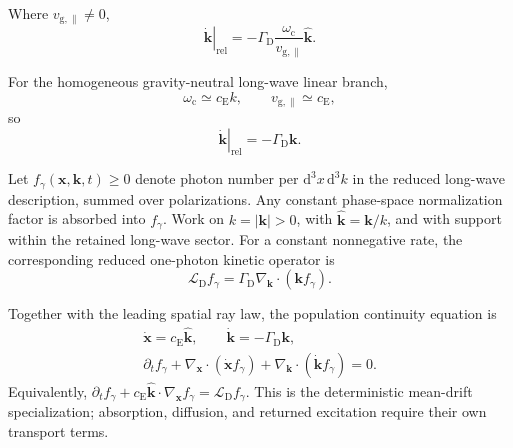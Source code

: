 Where $v_{\mathrm{g},\parallel}\neq0$,
\begin{equation}
    \boxed{
    \left.\dot{\mathbf{k}}\right|_{\mathrm{rel}}
    =
    -
    \Gamma_{\mathrm D}
    \frac{
        \omega_{\mathrm c}
    }{
        v_{\mathrm{g},\parallel}
    }
    \hat{\mathbf{k}}.
    }
    \label{eq:AQ_k_general}
\end{equation}

For the homogeneous gravity-neutral long-wave linear branch,
\begin{equation}
    \omega_{\mathrm c}
    \simeq
    c_{\mathrm E}k,
    \qquad
    v_{\mathrm{g},\parallel}
    \simeq
    c_{\mathrm E},
\end{equation}
so
\begin{equation}
    \boxed{
    \left.\dot{\mathbf{k}}\right|_{\mathrm{rel}}
    =
    -\Gamma_{\mathrm D}\mathbf{k}.
    }
    \label{eq:AQ_k_simple}
\end{equation}

Let $f_{\gamma}(\mathbf x,\mathbf k,t)\geq0$ denote photon number per
$\mathrm d^3x\,\mathrm d^3k$ in the reduced long-wave description, summed over
polarizations. Any constant phase-space normalization factor is absorbed
into $f_{\gamma}$. Work on $k=|\mathbf k|>0$, with
$\hat{\mathbf k}=\mathbf k/k$, and with support within the retained long-wave
sector. For a constant nonnegative rate, the corresponding reduced
one-photon kinetic operator is
\begin{equation}
    \boxed{
    \mathcal L_{\mathrm D}f_{\gamma}
    =
    \Gamma_{\mathrm D}
    \nabla_{\mathbf{k}}
    \cdot
    \left(
        \mathbf{k}f_{\gamma}
    \right).
    }
    \label{eq:AQ_LD}
\end{equation}

Together with the leading spatial ray law, the population continuity
equation is
\[
\begin{gathered}
    \dot{\mathbf{x}}=c_{\mathrm E}\hat{\mathbf{k}},
    \qquad
    \dot{\mathbf{k}}=-\Gamma_{\mathrm D}\mathbf{k},\\
    \partial_t f_{\gamma}
    +\nabla_{\mathbf{x}}\cdot(\dot{\mathbf{x}}f_{\gamma})
    +\nabla_{\mathbf{k}}\cdot(\dot{\mathbf{k}}f_{\gamma})=0.
\end{gathered}
\]
Equivalently,
$\partial_t f_{\gamma}+c_{\mathrm E}\hat{\mathbf k}\cdot
\nabla_{\mathbf x}f_{\gamma}=\mathcal L_{\mathrm D}f_{\gamma}$.
This is the deterministic mean-drift specialization; absorption, diffusion,
and returned excitation require their own transport terms.

